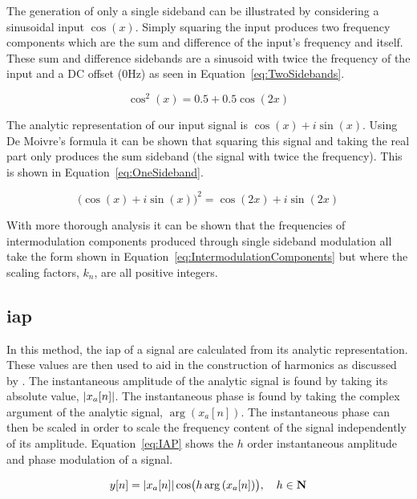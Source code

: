 		The generation of only a single sideband can be illustrated by considering a sinusoidal input $\cos(x)$.
		Simply squaring the input produces two frequency components which are the sum and difference of the input's
		frequency and itself. These sum and difference sidebands are a sinusoid with twice the frequency of the
		input and a DC offset (0Hz) as seen in Equation~\ref{eq:TwoSidebands}.

		\begin{equation}
			\cos^{2}(x) = 0.5 + 0.5 \cos(2x)
			\label{eq:TwoSidebands}
		\end{equation}

		The analytic representation of our input signal is $\cos(x) + i\sin(x)$. Using De Moivre's formula it can
		be shown that squaring this signal and taking the real part only produces the sum sideband (the signal with
		twice the frequency). This is shown in Equation~\ref{eq:OneSideband}.

		\begin{equation}
			\bigl( \cos(x) + i\sin(x) \bigr)^{2} = \cos(2x) + i\sin(2x)
			\label{eq:OneSideband}
		\end{equation}

		With more thorough analysis it can be shown that the frequencies of intermodulation components produced
		through single sideband modulation all take the form shown in Equation~\ref{eq:IntermodulationComponents}
		but where the scaling factors, $k_{n}$, are all positive integers.

	\subsection{\acrlong{iap}}
	\label{sec:Excitation-Methods-IAP}
		In this method, the \acrfull{iap} of a signal are calculated from its analytic representation. These values
		are then used to aid in the construction of harmonics as discussed by \citet{puckette2007patch}. The
		instantaneous amplitude of the analytic signal is found by taking its absolute value, $\left|x_{a}[n]\right|$. The
		instantaneous phase is found by taking the complex argument of the analytic signal, $\arg(x_{a}[n])$. The
		instantaneous phase can then be scaled in order to scale the frequency content of the signal independently
		of its amplitude.  Equation~\ref{eq:IAP} shows the $h$ order instantaneous amplitude and phase
		modulation of a signal.

		\begin{equation}
			y[n] = \left|x_{a}[n]\right| \cos \bigl( h\arg \left( x_{a}[n] \right) \bigr), \quad h \in \textbf{N}
			\label{eq:IAP}
		\end{equation}

